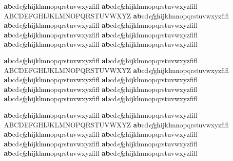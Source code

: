 \documentclass[a4paper,twoside,11pt]{article}
\begin{document}
\Large

\textbf{ab}cd\textit{ef}ghijklmnopqrstuvwxyzfifl \fontname\font
{\selectfont \textbf{ab}cd\textit{ef}ghijklmnopqrstuvwxyzfifl \fontname\font}
{\selectfont ABCDEFGHIJKLMNOPQRSTUVWXYZ \fontname\font}
{\selectfont \textbf{ab}cd\textit{ef}ghijklmnopqrstuvwxyzfifl \fontname\font}
{\selectfont \textbf{ab}cd\textit{ef}ghijklmnopqrstuvwxyzfifl \fontname\font}
{\selectfont \textbf{ab}cd\textit{ef}ghijklmnopqrstuvwxyzfifl \fontname\font}
{\selectfont \textbf{ab}cd\textit{ef}ghijklmnopqrstuvwxyzfifl \fontname\font}
{\selectfont \textbf{ab}cd\textit{ef}ghijklmnopqrstuvwxyzfifl \fontname\font}
{\selectfont \textbf{ab}cd\textit{ef}ghijklmnopqrstuvwxyzfifl \fontname\font}
{\selectfont \textbf{ab}cd\textit{ef}ghijklmnopqrstuvwxyzfifl \fontname\font}

\huge
\textbf{ab}cd\textit{ef}ghijklmnopqrstuvwxyzfifl \fontname\font
{\selectfont \textbf{ab}cd\textit{ef}ghijklmnopqrstuvwxyzfifl \fontname\font}
{\selectfont ABCDEFGHIJKLMNOPQRSTUVWXYZ \fontname\font}
{\selectfont \textbf{ab}cd\textit{ef}ghijklmnopqrstuvwxyzfifl \fontname\font}
{\selectfont \textbf{ab}cd\textit{ef}ghijklmnopqrstuvwxyzfifl \fontname\font}
{\selectfont \textbf{ab}cd\textit{ef}ghijklmnopqrstuvwxyzfifl \fontname\font}
{\selectfont \textbf{ab}cd\textit{ef}ghijklmnopqrstuvwxyzfifl \fontname\font}
{\selectfont \textbf{ab}cd\textit{ef}ghijklmnopqrstuvwxyzfifl \fontname\font}
{\selectfont \textbf{ab}cd\textit{ef}ghijklmnopqrstuvwxyzfifl \fontname\font}
{\selectfont \textbf{ab}cd\textit{ef}ghijklmnopqrstuvwxyzfifl \fontname\font}

\Huge

\textbf{ab}cd\textit{ef}ghijklmnopqrstuvwxyzfifl \fontname\font
{\selectfont \textbf{ab}cd\textit{ef}ghijklmnopqrstuvwxyzfifl \fontname\font}
{\selectfont ABCDEFGHIJKLMNOPQRSTUVWXYZ \fontname\font}
{\selectfont \textbf{ab}cd\textit{ef}ghijklmnopqrstuvwxyzfifl \fontname\font}
{\selectfont \textbf{ab}cd\textit{ef}ghijklmnopqrstuvwxyzfifl \fontname\font}
{\selectfont \textbf{ab}cd\textit{ef}ghijklmnopqrstuvwxyzfifl \fontname\font}
{\selectfont \textbf{ab}cd\textit{ef}ghijklmnopqrstuvwxyzfifl \fontname\font}
{\selectfont \textbf{ab}cd\textit{ef}ghijklmnopqrstuvwxyzfifl \fontname\font}
{\selectfont \textbf{ab}cd\textit{ef}ghijklmnopqrstuvwxyzfifl \fontname\font}
{\selectfont \textbf{ab}cd\textit{ef}ghijklmnopqrstuvwxyzfifl \fontname\font}
\end{document}

